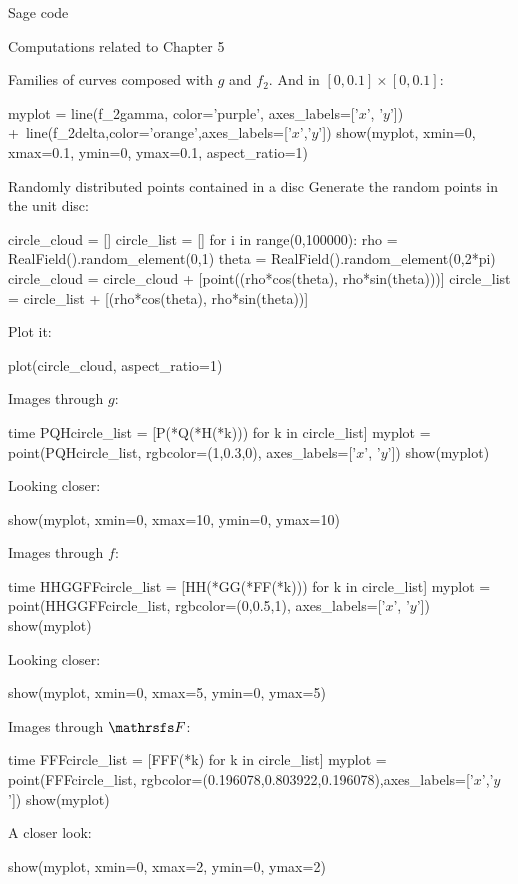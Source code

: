 \documentclass[11pt, a4paper, english, twoside, notitlepage, openright]{report}
\begin{document}
\begin{chapter}{Sage code}
\begin{section}{Computations related to Chapter 5}
\begin{subsection}{Families of curves composed with $g$ and $f_2$.}
And in $[0,0.1]\times[0,0.1]$:
\begin{sage}
myplot = line(f_2gamma, color='purple', axes_labels=['$x$', '$y$']) +\
    line(f_2delta,color='orange',axes_labels=['$x$','$y$'])
show(myplot, xmin=0, xmax=0.1, ymin=0, ymax=0.1, aspect_ratio=1)
\end{sage}
\end{subsection}

\begin{subsection}{Randomly distributed points contained in a disc}
Generate the random points in the unit disc:
\begin{sage}
circle_cloud = []
circle_list = []
for i in range(0,100000):
    rho = RealField().random_element(0,1)
    theta = RealField().random_element(0,2*pi)
    circle_cloud = circle_cloud + [point((rho*cos(theta), rho*sin(theta)))]
    circle_list = circle_list + [(rho*cos(theta), rho*sin(theta))]
\end{sage}

Plot it:
\begin{sage}
plot(circle_cloud, aspect_ratio=1)
\end{sage}

Images through $g$:
\begin{sage}
time PQHcircle_list = [P(*Q(*H(*k))) for k in circle_list]
myplot = point(PQHcircle_list, rgbcolor=(1,0.3,0), axes_labels=['$x$', '$y$'])
show(myplot)
\end{sage}

Looking closer:
\begin{sage}
show(myplot, xmin=0, xmax=10, ymin=0, ymax=10)
\end{sage}

Images through $f$:
\begin{sage}
time HHGGFFcircle_list = [HH(*GG(*FF(*k))) for k in circle_list]
myplot = point(HHGGFFcircle_list, rgbcolor=(0,0.5,1), axes_labels=['$x$', '$y$'])
show(myplot)
\end{sage}

Looking closer:
\begin{sage}
show(myplot, xmin=0, xmax=5, ymin=0, ymax=5)
\end{sage}

Images through $\FFF$:
\begin{sage}
time FFFcircle_list = [FFF(*k) for k in circle_list]
myplot = point(FFFcircle_list, rgbcolor=(0.196078,0.803922,0.196078),axes_labels=['$x$','$y$'])
show(myplot)
\end{sage}

A closer look:
\begin{sage}
show(myplot, xmin=0, xmax=2, ymin=0, ymax=2)
\end{sage}


\end{subsection}
\end{section}
\end{chapter}
\end{document}
